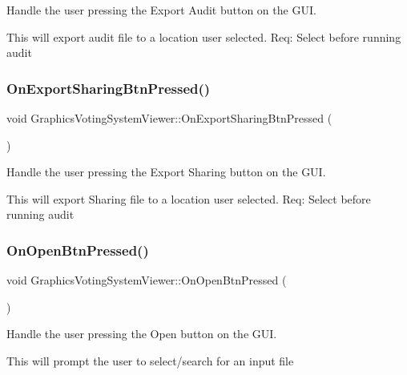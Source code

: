 Handle the user pressing the Export Audit button on the G\+UI. 

This will export audit file to a location user selected. Req\+: Select before running audit \mbox{\label{classGraphicsVotingSystemViewer_a6f132616969b7fe7ba844e9569912074}} 
\subsubsection{\texorpdfstring{On\+Export\+Sharing\+Btn\+Pressed()}{OnExportSharingBtnPressed()}}
{\footnotesize\ttfamily void Graphics\+Voting\+System\+Viewer\+::\+On\+Export\+Sharing\+Btn\+Pressed (\begin{DoxyParamCaption}{ }\end{DoxyParamCaption})}



Handle the user pressing the Export Sharing button on the G\+UI. 

This will export Sharing file to a location user selected. Req\+: Select before running audit \mbox{\label{classGraphicsVotingSystemViewer_a457e7a3289e9dc9398d6b2e70e3ab009}} 
\subsubsection{\texorpdfstring{On\+Open\+Btn\+Pressed()}{OnOpenBtnPressed()}}
{\footnotesize\ttfamily void Graphics\+Voting\+System\+Viewer\+::\+On\+Open\+Btn\+Pressed (\begin{DoxyParamCaption}{ }\end{DoxyParamCaption})}



Handle the user pressing the Open button on the G\+UI. 

This will prompt the user to select/search for an input file \mbox{\label{classGraphicsVotingSystemViewer_aeeb0a10bc206355565d3e26fbbf16b20}} 
